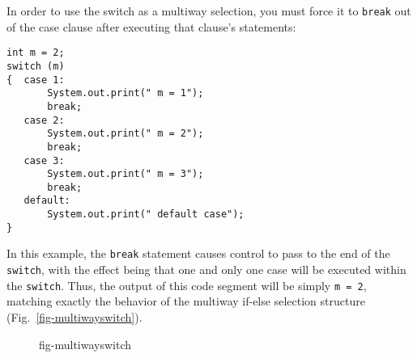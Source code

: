 In order to use the switch as a multiway selection, you must force it
to {\tt break} out of the case clause after executing
that clause's statements:

\begin{jjjlisting}
\begin{lstlisting}
int m = 2;
switch (m)
{  case 1:
       System.out.print(" m = 1");
       break;
   case 2:
       System.out.print(" m = 2");
       break;
   case 3:
       System.out.print(" m = 3");
       break;
   default:
       System.out.print(" default case");
}
\end{lstlisting}
\end{jjjlisting}


\noindent In this example, the {\tt break} statement causes control to
pass to the end of the {\tt switch}, with the effect being that one
and only one case will be executed within the {\tt switch}. Thus, the
output of this code segment will be simply \mbox{\tt m = 2}, matching
exactly the behavior of the multiway if-else selection structure
(Fig.~\ref{fig-multiwayswitch}).

\begin{figure}[hbt]
{fig-multiwayswitch}

\end{figure}







